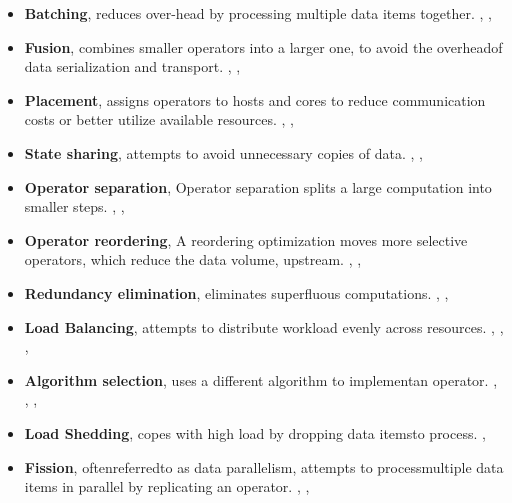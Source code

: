 \begin{itemize}
    \item \textbf{Batching}, reduces over-head by processing multiple data items together. \cite{Carney}, \cite{Gordon}, \cite{Welsh}
    
    \item \textbf{Fusion}, combines smaller operators  into  a  larger  one,  to  avoid  the  overheadof data serialization and transport. \cite{Gordon}, \cite{Tatbul}, \cite{Khandekar}
    
    \item \textbf{Placement}, assigns operators  to  hosts  and  cores  to  reduce  communication  costs  or  better  utilize  available  resources. \cite{Gordon}, \cite{Pietzuch}, \cite{Wolf}
    
    \item \textbf{State sharing}, attempts to  avoid  unnecessary  copies  of  data. \cite{Brito}, \cite{Arasu}, \cite{Sermulins}
    
    \item \textbf{Operator separation}, Operator separation  splits  a  large  computation  into  smaller steps. \cite{dbms}, \cite{Yu}, \cite{Ottoni}
    
    \item \textbf{Operator reordering}, A  reordering optimization moves more selective operators, which reduce the data volume,  upstream. \cite{dbms}, \cite{Graefe}, \cite{Avnur}
    
    \item \textbf{Redundancy elimination}, eliminates superfluous computations. \cite{Forgy}, \cite{Chen}, \cite{Pietzuch}
    
    \item \textbf{Load Balancing}, attempts  to  distribute  workload  evenly  across resources. \cite{Gordon}, \cite{Arpaci}, \cite{Caneill}, \cite{Amini}
    
    \item \textbf{Algorithm selection}, uses  a  different  algorithm  to  implementan operator. \cite{dbms}, \cite{Welsh}, \cite{Wolf}, \cite{Abadi}
    
    \item \textbf{Load Shedding}, copes  with  high  load  by  dropping  data  itemsto   process. \cite{Tatbul}, \cite{Gedik}
    
    \item \textbf{Fission}, oftenreferredto   as   data   parallelism,   attempts   to   processmultiple data items in parallel by replicating an operator. \cite{Gordon}, \cite{Schneider}, \cite{Brito}
\end{itemize} 

